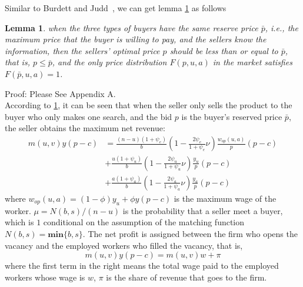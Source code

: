 \documentclass[ %
    final,
    scrbook,
    listoffigures,
    listoftables, 
    glossary]{cu-thesis}
\newtheorem{lemma}[theorem]{Lemma}
\begin{document}
Similar to Burdett and Judd~\cite{burdett1983equilibrium},  we can get lemma \ref{Lemma} as follows
\begin{lemma}\label{Lemma}
when the three types of buyers have the same reserve price $\bar{p}$, i.e., the maximum price that the buyer is willing to pay, and the sellers know the information, then the sellers' optimal price $p$ should be less than or equal to $\bar{p}$, that is, $p\leq \bar{p}$, and the only price distribution $F(p,u,a)$ in the market satisfies $F(\bar{p},u,a)=1$.
\end{lemma}
Proof: Please See Appendix A.\\
According to \ref{Lemma}, it can be seen that when the seller only sells the product to the buyer who only makes one search, and the bid $p$ is the buyer's reserved price $\bar{p}$, the seller obtains the maximum net revenue:
\begin{equation} \label{eq5}
\begin{split}
m(u,v)y(p-c)&= \frac{(n-u)(1+\psi_e)}{b}(1-\frac{2\psi_e}{1+\psi_e}\nu)\frac{w_{op}(u,a)}{p}(p-c)\\
&+\frac{u(1+\psi_u)}{b}(1-\frac{2\psi_u}{1+\psi_u}\nu)\frac{y_u}{p}(p-c)\\
&+\frac{a(1+\psi_a)}{b}(1-\frac{2\psi_a}{1+\psi_a}\nu)\frac{y_a}{p}(p-c)
\end{split}
\end{equation}
where $w_{op}(u,a)=(1-\phi)y_u+\phi y(p-c)$ is the maximum wage of the worker. $\mu=N(b,s)/(n-u)$ is the probability that a seller meet a buyer, which is $1$ conditional on the assumption of the matching function $N(b,s)=\textbf{min}\{b,s\}$. 
\vspace{2mm}
\newline The net profit is assigned between the firm who opens the vacancy and the employed workers who filled the vacancy, that is, 
\begin{equation} \label{eq6}
   m(u,v)y(p-c) = m(u,v)w+\pi
\end{equation}
where the first term in the right means the total wage paid to the employed workers whose wage is $w$, $\pi$ is the share of revenue that goes to the firm.
\end{document}

